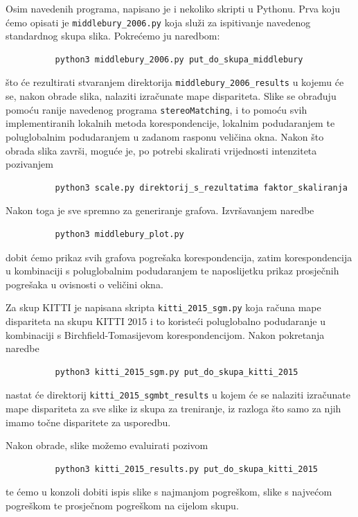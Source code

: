 \documentclass[utf8, zavrsni, numeric]{fer}
\begin{document}
Osim navedenih programa, napisano je i nekoliko skripti u Pythonu. Prva koju ćemo opisati je
{\verb|middlebury_2006.py|} koja služi za ispitivanje navedenog standardnog skupa slika.
Pokrećemo ju naredbom:
\begin{verbatim}
          python3 middlebury_2006.py put_do_skupa_middlebury
\end{verbatim}
što će rezultirati stvaranjem direktorija {\verb|middlebury_2006_results|} u kojemu će se, nakon
obrade slika, nalaziti izračunate mape dispariteta. Slike se obrađuju pomoću ranije navedenog
programa {\verb|stereoMatching|}, i to pomoću svih implementiranih lokalnih metoda korespondencije, lokalnim
podudaranjem te poluglobalnim podudaranjem u zadanom rasponu veličina okna.
Nakon što obrada slika završi, moguće je, po potrebi skalirati vrijednosti intenziteta
pozivanjem
\begin{verbatim}
          python3 scale.py direktorij_s_rezultatima faktor_skaliranja
\end{verbatim}

Nakon toga je sve spremno za generiranje grafova. Izvršavanjem naredbe
\begin{verbatim}
          python3 middlebury_plot.py
\end{verbatim}
dobit ćemo prikaz svih grafova pogrešaka korespondencija, zatim korespondencija u kombinaciji
s poluglobalnim podudaranjem te naposlijetku prikaz prosječnih pogrešaka u ovisnosti o
veličini okna.

Za skup KITTI je napisana skripta {\verb|kitti_2015_sgm.py|} koja računa mape dispariteta
na skupu KITTI 2015 i to koristeći poluglobalno podudaranje u kombinaciji s Birchfield-Tomasijevom korespondencijom. Nakon pokretanja naredbe
\begin{verbatim}
          python3 kitti_2015_sgm.py put_do_skupa_kitti_2015
\end{verbatim}
nastat će direktorij {\verb|kitti_2015_sgmbt_results|} u kojem će se nalaziti izračunate
mape dispariteta za sve slike iz skupa za treniranje, iz razloga što samo za njih imamo točne
disparitete za usporedbu.

Nakon obrade, slike možemo evaluirati pozivom
\begin{verbatim}
          python3 kitti_2015_results.py put_do_skupa_kitti_2015
\end{verbatim}
te ćemo u konzoli dobiti ispis slike s najmanjom pogreškom, slike s najvećom pogreškom te
prosječnom pogreškom na cijelom skupu.
\end{document}
